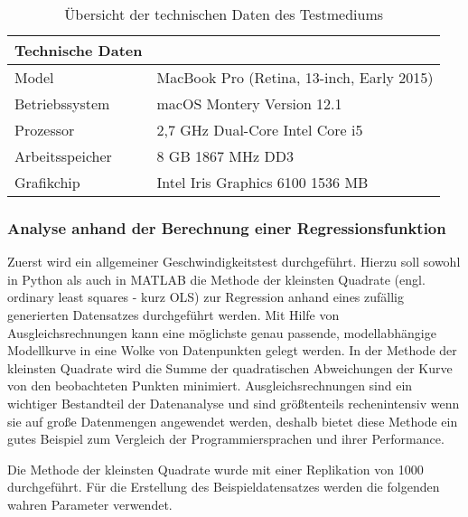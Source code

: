\begin{table}[H]
	\centering
	\begin{tabular}{|l|l|}
		\multicolumn{1}{l}{\textbf{Technische Daten}} & \multicolumn{1}{l}{}                       \\ 
		\hline
		Model                                         & MacBook Pro (Retina, 13-inch, Early 2015)  \\ 
		\hline
		Betriebssystem                                & macOS Montery Version 12.1                 \\ 
		\hline
		Prozessor                                     & 2,7 GHz Dual-Core Intel Core i5            \\ 
		\hline
		Arbeitsspeicher                               & 8 GB 1867 MHz DD3                          \\ 
		\hline
		Grafikchip                                    & Intel Iris Graphics 6100 1536 MB           \\
		\hline
	\end{tabular}
	\caption{Übersicht der technischen Daten des Testmediums}
\end{table}

\subsubsection{Analyse anhand der Berechnung einer Regressionsfunktion}

Zuerst wird ein allgemeiner Geschwindigkeitstest durchgeführt. Hierzu soll sowohl in Python als auch in MATLAB die Methode der kleinsten Quadrate (engl. ordinary least squares - kurz OLS) zur Regression anhand eines zufällig generierten Datensatzes durchgeführt werden. Mit Hilfe von Ausgleichsrechnungen kann eine möglichste genau passende, modellabhängige Modellkurve in eine Wolke von Datenpunkten gelegt werden. In der Methode der kleinsten Quadrate wird die Summe der quadratischen Abweichungen der Kurve von den beobachteten Punkten minimiert. Ausgleichsrechnungen sind ein wichtiger Bestandteil der Datenanalyse und sind größtenteils rechenintensiv wenn sie auf große Datenmengen angewendet werden, deshalb bietet diese Methode ein gutes Beispiel zum Vergleich der Programmiersprachen und ihrer Performance. 

Die Methode der kleinsten Quadrate wurde mit einer Replikation von 1000 durchgeführt. Für die Erstellung des Beispieldatensatzes werden die folgenden wahren Parameter verwendet.


